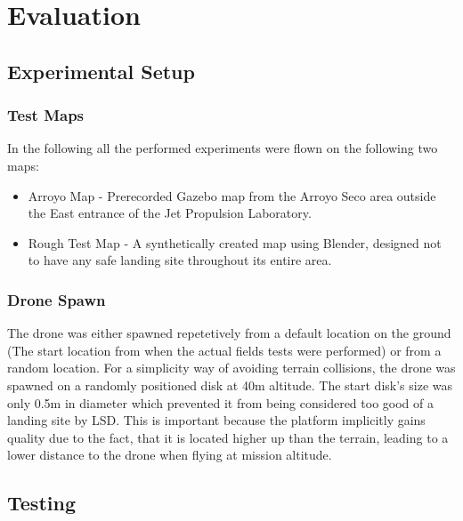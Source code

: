 \chapter{Evaluation}
\label{chapter:evaluation}

\section{Experimental Setup}
\subsection{Test Maps}
In the following all the performed experiments were flown on the following two maps:
\begin{itemize}
    \item Arroyo Map - Prerecorded Gazebo map from the Arroyo Seco area outside the East entrance of the Jet Propulsion Laboratory.
    \item Rough Test Map - A synthetically created map using Blender, designed not to have any safe landing site throughout its entire area. 
\end{itemize}
\subsection{Drone Spawn}
The drone was either spawned repetetively from a default location on the ground (The start location from when the actual fields tests were performed) or from a random location. For a simplicity way of  avoiding terrain collisions, the drone was spawned on a randomly positioned disk at 40m altitude. The start disk's size was only 0.5m in diameter which prevented it from being considered too good of a landing site by LSD. This is important because the platform implicitly gains quality due to the fact, that it is located higher up than the terrain, leading to a lower distance to the drone when flying at mission altitude.


\section{Testing}


